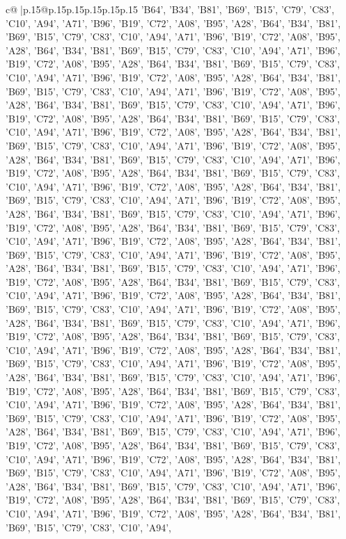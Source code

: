 \documentclass{article}
\begin{document}
{\begin{supertabular}{c@{$\;$}|p{.15\linewidth}@{}p{.15\linewidth}p{.15\linewidth}p{.15\linewidth}p{.15\linewidth}p{.15\linewidth}}
{{{{'B64', 'B34', 'B81', 'B69', 'B15', 'C79', 'C83', 'C10', 'A94', 'A71', 'B96', 'B19', 'C72', 'A08', 'B95', 'A28', 'B64', 'B34', 'B81', 'B69', 'B15', 'C79', 'C83', 'C10', 'A94', 'A71', 'B96', 'B19', 'C72', 'A08', 'B95', 'A28', 'B64', 'B34', 'B81', 'B69', 'B15', 'C79', 'C83', 'C10', 'A94', 'A71', 'B96', 'B19', 'C72', 'A08', 'B95', 'A28', 'B64', 'B34', 'B81', 'B69', 'B15', 'C79', 'C83', 'C10', 'A94', 'A71', 'B96', 'B19', 'C72', 'A08', 'B95', 'A28', 'B64', 'B34', 'B81', 'B69', 'B15', 'C79', 'C83', 'C10', 'A94', 'A71', 'B96', 'B19', 'C72', 'A08', 'B95', 'A28', 'B64', 'B34', 'B81', 'B69', 'B15', 'C79', 'C83', 'C10', 'A94', 'A71', 'B96', 'B19', 'C72', 'A08', 'B95', 'A28', 'B64', 'B34', 'B81', 'B69', 'B15', 'C79', 'C83', 'C10', 'A94', 'A71', 'B96', 'B19', 'C72', 'A08', 'B95', 'A28', 'B64', 'B34', 'B81', 'B69', 'B15', 'C79', 'C83', 'C10', 'A94', 'A71', 'B96', 'B19', 'C72', 'A08', 'B95', 'A28', 'B64', 'B34', 'B81', 'B69', 'B15', 'C79', 'C83', 'C10', 'A94', 'A71', 'B96', 'B19', 'C72', 'A08', 'B95', 'A28', 'B64', 'B34', 'B81', 'B69', 'B15', 'C79', 'C83', 'C10', 'A94', 'A71', 'B96', 'B19', 'C72', 'A08', 'B95', 'A28', 'B64', 'B34', 'B81', 'B69', 'B15', 'C79', 'C83', 'C10', 'A94', 'A71', 'B96', 'B19', 'C72', 'A08', 'B95', 'A28', 'B64', 'B34', 'B81', 'B69', 'B15', 'C79', 'C83', 'C10', 'A94', 'A71', 'B96', 'B19', 'C72', 'A08', 'B95', 'A28', 'B64', 'B34', 'B81', 'B69', 'B15', 'C79', 'C83', 'C10', 'A94', 'A71', 'B96', 'B19', 'C72', 'A08', 'B95', 'A28', 'B64', 'B34', 'B81', 'B69', 'B15', 'C79', 'C83', 'C10', 'A94', 'A71', 'B96', 'B19', 'C72', 'A08', 'B95', 'A28', 'B64', 'B34', 'B81', 'B69', 'B15', 'C79', 'C83', 'C10', 'A94', 'A71', 'B96', 'B19', 'C72', 'A08', 'B95', 'A28', 'B64', 'B34', 'B81', 'B69', 'B15', 'C79', 'C83', 'C10', 'A94', 'A71', 'B96', 'B19', 'C72', 'A08', 'B95', 'A28', 'B64', 'B34', 'B81', 'B69', 'B15', 'C79', 'C83', 'C10', 'A94', 'A71', 'B96', 'B19', 'C72', 'A08', 'B95', 'A28', 'B64', 'B34', 'B81', 'B69', 'B15', 'C79', 'C83', 'C10', 'A94', 'A71', 'B96', 'B19', 'C72', 'A08', 'B95', 'A28', 'B64', 'B34', 'B81', 'B69', 'B15', 'C79', 'C83', 'C10', 'A94', 'A71', 'B96', 'B19', 'C72', 'A08', 'B95', 'A28', 'B64', 'B34', 'B81', 'B69', 'B15', 'C79', 'C83', 'C10', 'A94', 'A71', 'B96', 'B19', 'C72', 'A08', 'B95', 'A28', 'B64', 'B34', 'B81', 'B69', 'B15', 'C79', 'C83', 'C10', 'A94', 'A71', 'B96', 'B19', 'C72', 'A08', 'B95', 'A28', 'B64', 'B34', 'B81', 'B69', 'B15', 'C79', 'C83', 'C10', 'A94', 'A71', 'B96', 'B19', 'C72', 'A08', 'B95', 'A28', 'B64', 'B34', 'B81', 'B69', 'B15', 'C79', 'C83', 'C10', 'A94', 'A71', 'B96', 'B19', 'C72', 'A08', 'B95', 'A28', 'B64', 'B34', 'B81', 'B69', 'B15', 'C79', 'C83', 'C10', 'A94', 'A71', 'B96', 'B19', 'C72', 'A08', 'B95', 'A28', 'B64', 'B34', 'B81', 'B69', 'B15', 'C79', 'C83', 'C10', 'A94', 'A71', 'B96', 'B19', 'C72', 'A08', 'B95', 'A28', 'B64', 'B34', 'B81', 'B69', 'B15', 'C79', 'C83', 'C10', 'A94', 'A71', 'B96', 'B19', 'C72', 'A08', 'B95', 'A28', 'B64', 'B34', 'B81', 'B69', 'B15', 'C79', 'C83', 'C10', 'A94', 'A71', 'B96', 'B19', 'C72', 'A08', 'B95', 'A28', 'B64', 'B34', 'B81', 'B69', 'B15', 'C79', 'C83', 'C10', 'A94', 'A71', 'B96', 'B19', 'C72', 'A08', 'B95', 'A28', 'B64', 'B34', 'B81', 'B69', 'B15', 'C79', 'C83', 'C10', 'A94', }}}}
\end{supertabular}}
\end{document}
